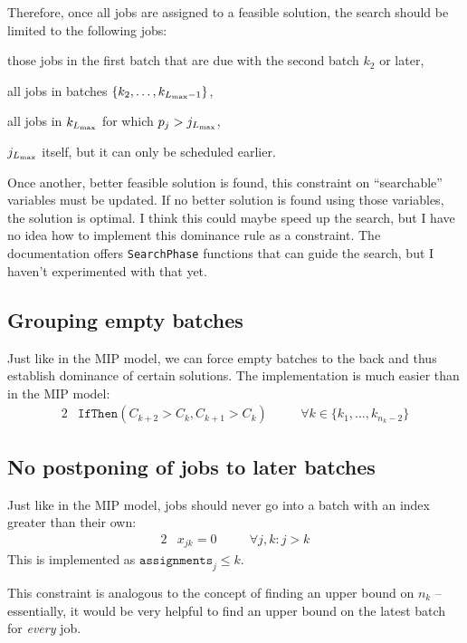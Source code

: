 \documentclass[13pt, letterpaper, twoside]{book}
\begin{document}
Therefore, once all jobs are assigned to a feasible solution, the search should be limited
to the following jobs:
\begin{alist}
\item{those jobs in the first batch that are due with the second batch $k_2$ or
later,}
\item{all jobs in batches $\{k_2, \dots, k_{L_{\text{max}}-1}\}$,}
\item{all jobs in $k_{L_{\text{max}}}$ for which $p_j > j_{L_{\text{max}}}$,}
\item{$j_{L_{\text{max}}}$ itself, but it can only be scheduled earlier.}
\end{alist}

Once another, better feasible solution is found, this constraint on
``searchable'' variables must be updated. If no better solution is found using
those variables, the solution is optimal. {\color{darkred} I think this could
maybe speed up the search, but I have no idea how to implement this dominance
rule as a constraint. The documentation offers \texttt{SearchPhase} functions
that can guide the search, but I haven't experimented with that yet.}

\subsection{Grouping empty batches}
Just like in the MIP model, we can force empty batches to the back and thus
establish dominance of certain solutions. The implementation is much easier than
in the MIP model:
\begin{alignat}{2}
& \mathtt{IfThen}( C_{k+2} > C_{k}, C_{k+1} > C_{k} ) \quad && \forall k \in
\{k_1, \dots, k_{n_k-2}\}
\end{alignat}

\subsection{No postponing of jobs to later batches}
Just like in the MIP model, jobs should never go into a batch with an index
greater than their own:
\begin{alignat}{2}
  & x_{jk} = 0 \quad && \forall j,k : j > k
\end{alignat}
This is implemented as $\mathtt{assignments}_j \leq k$. 

{\color{darkred} This constraint is analogous to the concept of finding an upper
bound on $n_k$ -- essentially, it would be very helpful to find an upper bound
on the latest batch for \textit{every} job.}
\end{document}
